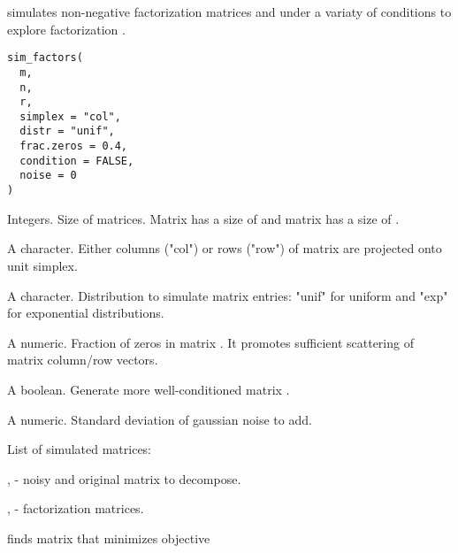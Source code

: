 \documentclass[letterpaper]{book}
\begin{document}
%
\begin{Description}\relax
{} simulates non-negative factorization matrices  and 
under a variaty of conditions to explore factorization .
\end{Description}
%
\begin{Usage}
\begin{verbatim}
sim_factors(
  m,
  n,
  r,
  simplex = "col",
  distr = "unif",
  frac.zeros = 0.4,
  condition = FALSE,
  noise = 0
)
\end{verbatim}
\end{Usage}
%
\begin{Arguments}
\begin{ldescription}
\item[\code{m, n, r}] Integers. Size of matrices. Matrix  has a size of 
and matrix  has a size of .

\item[\code{simplex}] A character. Either columns ("col") or rows ("row") of matrix  are projected onto unit simplex.

\item[\code{distr}] A character. Distribution to simulate matrix entries: "unif" for uniform and "exp" for exponential distributions.

\item[\code{frac.zeros}] A numeric. Fraction of zeros in matrix . It promotes sufficient scattering of matrix column/row vectors.

\item[\code{condition}] A boolean. Generate more well-conditioned matrix .

\item[\code{noise}] A numeric. Standard deviation of gaussian noise to add.
\end{ldescription}
\end{Arguments}
%
\begin{Value}
List of simulated matrices:

,  - noisy and original matrix  to decompose.

,  - factorization matrices.
\end{Value}
%
\begin{Description}\relax
{} finds matrix  that minimizes objective
\end{Description}
\end{document}

